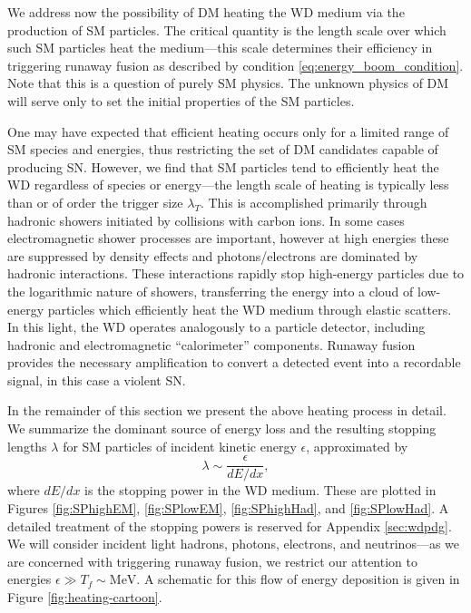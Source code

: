 We address now the possibility of DM heating the WD medium via the production of SM particles.
The critical quantity is the length scale over which such SM particles heat the medium---this scale determines their efficiency in triggering runaway fusion as described by condition \eqref{eq:energy_boom_condition}.
Note that this is a question of purely SM physics.
The unknown physics of DM will serve only to set the initial properties of the SM particles.

One may have expected that efficient heating occurs only for a limited range of SM species and energies, thus restricting the set of DM candidates capable of producing SN.
However, we find that SM particles tend to efficiently heat the WD regardless of species or energy---the length scale of heating is typically less than or of order the trigger size $\lambda_T$. 
This is accomplished primarily through hadronic showers initiated by collisions with carbon ions.
In some cases electromagnetic shower processes are important, however at high energies these are suppressed by density effects and photons/electrons are dominated by hadronic interactions.
These interactions rapidly stop high-energy particles due to the logarithmic nature of showers, transferring the energy into a cloud of low-energy particles which efficiently heat the WD medium through elastic scatters.
In this light, the WD operates analogously to a particle detector, including hadronic and electromagnetic ``calorimeter'' components.
Runaway fusion provides the necessary amplification to convert a detected event into a recordable signal, in this case a violent SN.

In the remainder of this section we present the above heating process in detail.
We summarize the dominant source of energy loss and the resulting stopping lengths $\lambda$ for SM particles of incident kinetic energy $\epsilon$, approximated by
\begin{equation}
\lambda \sim \frac{\epsilon}{dE/dx},
\end{equation}
where $dE/dx$ is the stopping power in the WD medium.
These are plotted in Figures \ref{fig:SPhighEM}, \ref{fig:SPlowEM}, \ref{fig:SPhighHad}, and \ref{fig:SPlowHad}.
A detailed treatment of the stopping powers is reserved for Appendix \ref{sec:wdpdg}. 
We will consider incident light hadrons, photons, electrons, and neutrinos---as we are concerned with triggering runaway fusion, we restrict our attention to energies $\epsilon \gg T_f \sim \text{MeV}$.
A schematic for this flow of energy deposition is given in Figure \ref{fig:heating-cartoon}.

